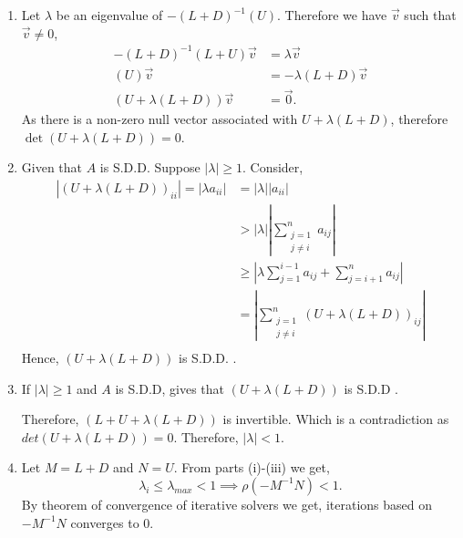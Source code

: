 \documentclass{report}
\begin{document}
\begin{solution}
\begin{enumerate}[label=(\alph*)]
		      \begin{enumerate} [label=(\roman*)]
			      \item Let $\lambda$ be an eigenvalue of $-(L+D)^{-1}\left( U \right)$. Therefore we have $\vec v $ such that $\vec v \neq 0$,
			            \begin{align*}
				            -(L+D)^{-1}\left( L+U \right)\vec{v} & =   \lambda \vec{{v}} \\
				            \left(U \right) \vec v               & =   -\lambda (L+D)\vec{{v}} \\
				            \left(U +\lambda (L+D)\right)\vec v  & =  \vec{0}
				            .\end{align*}
			            As there is a non-zero null vector associated with $U+\lambda \left( L+D \right)  $, therefore $\det(U+\lambda\left( L+D \right) ) = 0$.
			      \item Given that $A$ is S.D.D.  Suppose $|\lambda| \ge 1$. Consider,
			            \begin{align*}
				            |(U+\lambda(L+D) )_{ii}|  = |\lambda a_{ii}| & =  |\lambda| | a_{ii}| \\
				                                                         & >  |\lambda| | \sum_{\substack{j=1 \\j\neq i}}^{n} a_{ij} | \\
				                                                         & \ge |\lambda \sum_{j=1}^{i-1} a_{ij}  +  \sum_{j=i+1}^{n} a_{ij}  | \\
				                                                         & = | \sum_{\substack{j=1 \\j\neq i}}^{n} (U+\lambda (L+D) )_{ij} | \\
			            \end{align*}
			            Hence, $\left( U+\lambda(L+D)  \right) $ is S.D.D. .
			      \item If $|\lambda| \ge  1 $ and $A$ is S.D.D, gives that $(U+\lambda (L+D))$  is S.D.D .

			            Therefore, $(L+U+\lambda (L+D) )$ is invertible. Which is a contradiction as $det(U+\lambda (L+D))= 0$. Therefore, $|\lambda| < 1$.

			      \item Let $M =L+ D$ and $N=U$. From parts (i)-(iii) we get,
			            \[
				            \lambda_{i} \leq \lambda_{max} < 1 \implies \rho(-M^{-1}N) < 1
				            .\]
			            By theorem of convergence of iterative solvers we get, iterations based on $-M^{-1}N$ converges to $0$.

		      \end{enumerate}


	\end{enumerate}
\end{solution}
\end{document}
